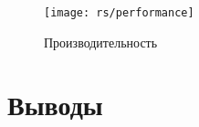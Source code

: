 \begin{figure}[H]
    \centering
    \texttt{[image: rs/performance]}
    \caption{Производительность}
    \label{fig:performance}
\end{figure}

\section{Выводы}

